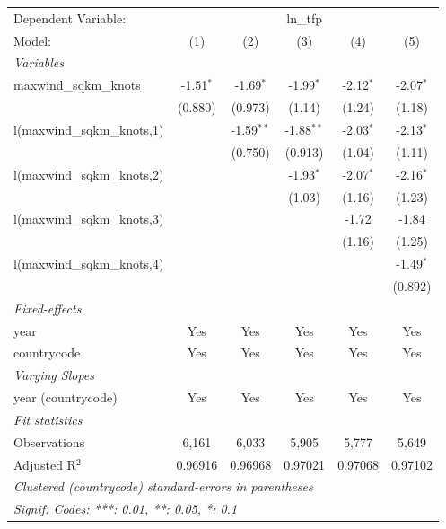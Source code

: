 
\begingroup
\centering
\begin{tabular}{lccccc}
   \tabularnewline \midrule \midrule
   Dependent Variable: & \multicolumn{5}{c}{ln\_tfp}\\
   Model:                      & (1)         & (2)          & (3)          & (4)         & (5)\\  
   \midrule
   \emph{Variables}\\
   maxwind\_sqkm\_knots        & -1.51$^{*}$ & -1.69$^{*}$  & -1.99$^{*}$  & -2.12$^{*}$ & -2.07$^{*}$\\   
                               & (0.880)     & (0.973)      & (1.14)       & (1.24)      & (1.18)\\   
   l(maxwind\_sqkm\_knots,1)   &             & -1.59$^{**}$ & -1.88$^{**}$ & -2.03$^{*}$ & -2.13$^{*}$\\   
                               &             & (0.750)      & (0.913)      & (1.04)      & (1.11)\\   
   l(maxwind\_sqkm\_knots,2)   &             &              & -1.93$^{*}$  & -2.07$^{*}$ & -2.16$^{*}$\\   
                               &             &              & (1.03)       & (1.16)      & (1.23)\\   
   l(maxwind\_sqkm\_knots,3)   &             &              &              & -1.72       & -1.84\\   
                               &             &              &              & (1.16)      & (1.25)\\   
   l(maxwind\_sqkm\_knots,4)   &             &              &              &             & -1.49$^{*}$\\   
                               &             &              &              &             & (0.892)\\   
   \midrule
   \emph{Fixed-effects}\\
   year                        & Yes         & Yes          & Yes          & Yes         & Yes\\  
   countrycode                 & Yes         & Yes          & Yes          & Yes         & Yes\\  
   \midrule
   \emph{Varying Slopes}\\
   year (countrycode)          & Yes         & Yes          & Yes          & Yes         & Yes\\  
   \midrule
   \emph{Fit statistics}\\
   Observations                & 6,161       & 6,033        & 5,905        & 5,777       & 5,649\\  
   Adjusted R$^2$              & 0.96916     & 0.96968      & 0.97021      & 0.97068     & 0.97102\\  
   \midrule \midrule
   \multicolumn{6}{l}{\emph{Clustered (countrycode) standard-errors in parentheses}}\\
   \multicolumn{6}{l}{\emph{Signif. Codes: ***: 0.01, **: 0.05, *: 0.1}}\\
\end{tabular}
\par\endgroup


